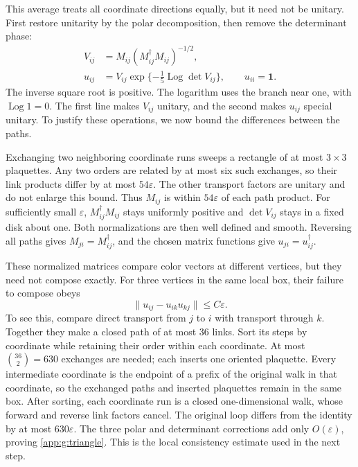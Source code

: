 \documentclass[11pt,a4paper]{article}
\theoremstyle{remark}
\newcommand{\Id}{\mathbf 1}
\newcommand{\eps}{\varepsilon}
\begin{document}
This average treats all coordinate directions equally, but it need not
be unitary. First restore unitarity by the polar decomposition, then
remove the determinant phase:
\begin{equation}
 \begin{aligned}
 V_{ij}&=M_{ij}(M_{ij}^{\dagger}M_{ij})^{-1/2},\\
 u_{ij}&=V_{ij}\exp\{-\tfrac15\operatorname{Log}\det V_{ij}\},
 \qquad u_{ii}=\Id .
 \end{aligned}
 \label{app:g:polar}
\end{equation}
The inverse square root is positive. The logarithm uses the branch near
one, with $\operatorname{Log}1=0$. The first line makes $V_{ij}$
unitary, and the second makes $u_{ij}$ special unitary. To justify
these operations, we now bound the differences between the paths.

Exchanging two neighboring coordinate runs sweeps a rectangle of at
most $3\times3$ plaquettes. Any two orders are related by at most six
such exchanges, so their link products differ by at most $54\eps$.
The other transport factors are unitary and do not enlarge this bound.
Thus $M_{ij}$ is within $54\eps$ of each path product. For sufficiently
small $\eps$, $M_{ij}^\dagger M_{ij}$ stays uniformly positive and
$\det V_{ij}$ stays in a fixed disk about one. Both normalizations are
then well defined and smooth. Reversing all paths gives
$M_{ji}=M_{ij}^\dagger$, and the chosen matrix functions give
$u_{ji}=u_{ij}^\dagger$.

These normalized matrices compare color vectors at different vertices,
but they need not compose exactly. For three vertices in the same
local box, their failure to compose obeys
\begin{equation}
 \|u_{ij}-u_{ik}u_{kj}\|\le C\eps .
 \label{app:g:triangle}
\end{equation}
To see this, compare direct transport from $j$ to $i$ with transport through
$k$. Together they make a closed path of at most 36 links. Sort its
steps by coordinate while retaining their order within each coordinate.
At most $\binom{36}{2}=630$ exchanges are needed; each inserts one
oriented plaquette. Every intermediate coordinate is the endpoint of
a prefix of the original walk in that coordinate, so the exchanged
paths and inserted plaquettes remain in the same box. After sorting,
each coordinate run is a closed one-dimensional walk, whose forward
and reverse link factors cancel. The original loop differs from the
identity by at most $630\eps$. The three polar and determinant
corrections add only $O(\eps)$, proving
\eqref{app:g:triangle}. This is the local consistency estimate used
in the next step.
\end{document}

